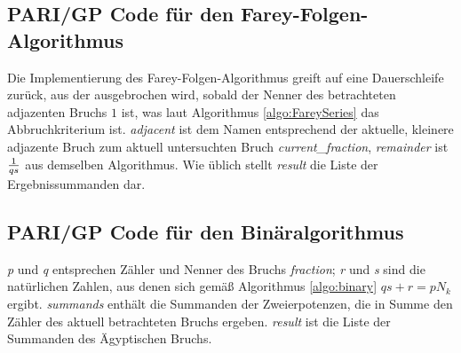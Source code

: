 \subsection{PARI/GP Code für den Farey-Folgen-Algorithmus}\label{code:fareyseries}
Die Implementierung des Farey-Folgen-Algorithmus greift auf eine Dauerschleife zurück, aus der ausgebrochen wird, sobald der Nenner des betrachteten adjazenten Bruchs $1$ ist, was laut Algorithmus \ref{algo:FareySeries} das Abbruchkriterium ist. \emph{adjacent} ist dem Namen entsprechend der aktuelle, kleinere adjazente Bruch zum aktuell untersuchten Bruch \emph{current\_fraction}, \emph{remainder} ist $\frac{1}{qs}$ aus demselben Algorithmus. Wie üblich stellt \emph{result} die Liste der Ergebnissummanden dar.


\subsection{PARI/GP Code für den Binäralgorithmus}
\emph{p} und \emph{q} entsprechen Zähler und Nenner des Bruchs \emph{fraction}; \emph{r} und \emph{s} sind die natürlichen Zahlen, aus denen sich gemäß Algorithmus \ref{algo:binary} $qs+r = pN_k$ ergibt. \emph{summands} enthält die Summanden der Zweierpotenzen, die in Summe den Zähler des aktuell betrachteten Bruchs ergeben. \emph{result} ist die Liste der Summanden des Ägyptischen Bruchs.
